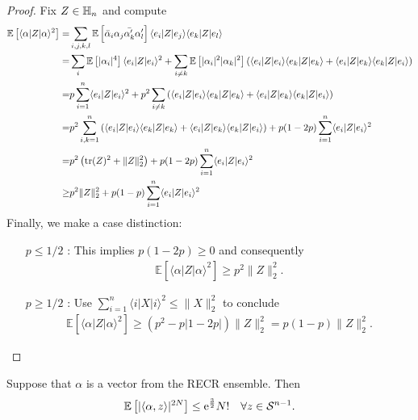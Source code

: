 \begin{proof}
Fix $ Z \in \mathbb{H}_n$ and compute
\begin{align*}
  \mathbb{E} \left[ \langle \alpha |  Z | \alpha \rangle^2 \right]
  =& \sum_{i,j,k,l} \mathbb{E} \left[ \bar{\alpha}_i \alpha_j \bar{\alpha^\prime_k} \alpha^\prime_l \right] \langle  e_i| Z|  e_j \rangle \langle  e_k | Z|  e_l \rangle \\
  =& \sum_{i} \mathbb{E} \left[ | \alpha_i |^4 \right] \langle  e_i| Z| e_i \rangle^2 + \sum_{i \neq k} \mathbb{E} \left[ | \alpha_i |^2 | \alpha_k|^2 \right] \left( \langle  e_i| Z| e_i \rangle \langle  e_k| Z| e_k \rangle + \langle  e_i| Z| e_k \rangle \langle  e_k|  Z| e_i \rangle \right) \\
  =& p \sum_{i=1}^n \langle  e_i| Z| e_i \rangle^2 + p^2 \sum_{i \neq k} \left( \langle  e_i| Z| e_i \rangle \langle  e_k| Z| e_k \rangle + \langle  e_i| Z| e_k \rangle \langle  e_k | Z|  e_i\rangle \right) \\
  =& p^2 \sum_{i,k=1}^n \left( \langle  e_i| Z| e_i \rangle \langle  e_k| Z| e_k \rangle + \langle  e_i| Z| e_k \rangle \langle  e_k | Z|  e_i\rangle \right) + p(1-2 p) \sum_{i=1}^n \langle  e_i| Z| e_i \rangle^2 \\
  =& p^2 \left( \operatorname{tr} ( Z)^2 + \| Z\|_2^2 \right) + p (1-2 p) \sum_{i=1}^n \langle  e_i|  Z |  e_i \rangle^2 \\
  \geq& p^2 \| Z\|_2^2 + p(1-p) \sum_{i=1}^n \langle  e_i | Z| e_i \rangle^2
\end{align*}
Finally, we make a case distinction:
\begin{itemize}
\item[$p \leq 1/2$]: This implies $p(1-2p) \geq 0$ and consequently
\begin{align*}
  \mathbb{E} \left[ \langle \alpha | Z| \alpha \rangle^2 \right] \geq p^2 \|  Z \|_2^2.
\end{align*}
\item[$p \geq 1/2$]: Use $\sum_{i=1}^n \langle i| X|i \rangle^2 \leq \| X \|_2^2$ to conclude
\begin{align*}
  \mathbb{E} \left[ \langle \alpha |  Z | \alpha \rangle^2 \right]
\geq ( p^2 - p|1-2p|) \| Z\|_2^2 = p(1-p) \|  Z \|_2^2.
\end{align*}
\end{itemize}
\end{proof}

\begin{lemma}
Suppose that $\alpha$ is a vector from the RECR ensemble. Then
\begin{align*}
\mathbb{E} \left[ | \langle \alpha,  z \rangle|^{2N} \right] \leq \mathrm{e}^{\frac{3}{2}} N! \quad \forall  z \in \mathcal{S}^{n-1}.
\end{align*}
\end{lemma}


